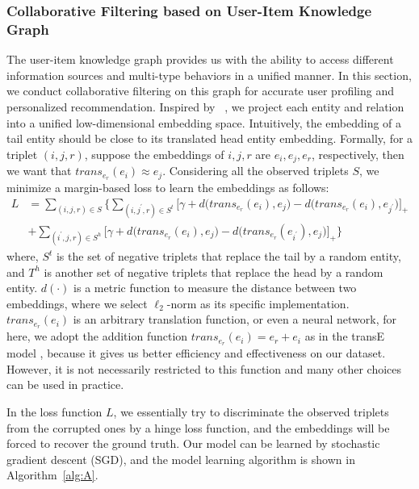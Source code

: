 \documentclass[algorithms,article,accept,moreauthors,pdftex,10pt,a4paper]{Definitions/mdpi}
\begin{document}
\subsubsection{Collaborative Filtering based on User-Item Knowledge Graph}
The user-item knowledge graph provides us with the ability to access different information sources and multi-type behaviors in a unified manner. In this section, we conduct collaborative filtering on this graph for accurate user profiling and personalized recommendation. Inspired by ~\cite{bordes2013translating}, we project each entity and relation into a unified low-dimensional embedding space. Intuitively, the embedding of a tail entity should be close to its translated head entity embedding. Formally, for a triplet $(i,j,r)$, suppose the embeddings of $i,j,r$ are $e_i,e_j,e_r$, respectively, then we want that $trans_{e_r}(e_i) \approx e_j$. 
Considering all the observed triplets $S$, we minimize a margin-based loss to learn the embeddings as follows:
\begin{equation}
\begin{aligned}
L &= \sum_{(i,j,r)\in S} \Big\{\sum_{(i,j^\prime,r)\in S^t} \big[\gamma+d\big(trans_{e_r}(e_i), e_j\big)-d\big(trans_{e_r}(e_{i}), e_{j^\prime}\big)\big]_+ \\
&+ \sum_{(i^\prime,j,r)\in S^h} \big[\gamma+d\big(trans_{e_r}(e_i), e_j\big)-d\big(trans_{e_r}(e_{i^\prime}), e_{j}\big)\big]_+ \Big\}
\end{aligned}
\end{equation}
where, $S^t$ is the set of negative triplets that replace the tail by a random entity, and $T^h$ is another set of negative triplets that replace the head by a random entity. $d(\cdot)$ is a metric function to measure the distance between two embeddings, where we select $\ell_2$-norm as its specific implementation. 
$trans_{e_r}(e_{i})$ is an arbitrary translation function, or even a neural network, for here, we adopt the addition function $trans_{e_r}(e_{i}) = e_r + e_i$ as in the transE model \cite{bordes2013translating}, because it gives us better efficiency and effectiveness on our dataset. However, it is not necessarily restricted to this function and many other choices can be used in practice.

In the loss function $L$, we essentially try to discriminate the observed triplets from the corrupted ones by a hinge loss function, and the embeddings will be forced to recover the ground truth.
Our model can be learned by stochastic gradient descent (SGD), and the model learning algorithm is shown in Algorithm~\ref{alg:A}.
\end{document}

